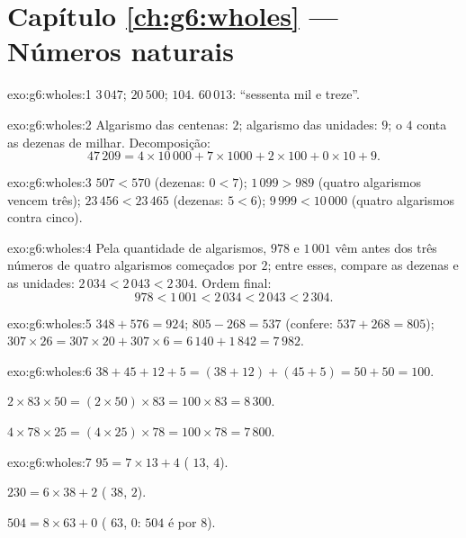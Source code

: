 \section*{Capítulo \ref{ch:g6:wholes} --- Números naturais}

\begin{solution}{exo:g6:wholes:1}
$3\,047$; \quad $20\,500$; \quad $104$. \quad
$60\,013$: ``sessenta mil e treze''.
\end{solution}

\begin{solution}{exo:g6:wholes:2}
Algarismo das centenas: $2$; algarismo das unidades: $9$; o $4$ conta as
dezenas de milhar. Decomposição:
\[
47\,209 = 4 \times 10\,000 + 7 \times 1000 + 2 \times 100 + 0 \times 10
+ 9 .
\]
\end{solution}

\begin{solution}{exo:g6:wholes:3}
$507 < 570$ (dezenas: $0 < 7$); \quad
$1\,099 > 989$ (quatro algarismos vencem três); \quad
$23\,456 < 23\,465$ (dezenas: $5 < 6$); \quad
$9\,999 < 10\,000$ (quatro algarismos contra cinco).
\end{solution}

\begin{solution}{exo:g6:wholes:4}
Pela quantidade de algarismos, $978$ e $1\,001$ vêm antes dos três
números de quatro algarismos começados por $2$; entre esses, compare as
dezenas e as unidades: $2\,034 < 2\,043 < 2\,304$. Ordem final:
\[
978 < 1\,001 < 2\,034 < 2\,043 < 2\,304 .
\]
\end{solution}

\begin{solution}{exo:g6:wholes:5}
$348 + 576 = 924$; \quad $805 - 268 = 537$ (confere:
$537 + 268 = 805$); \quad $307 \times 26 = 307 \times 20 + 307 \times 6
= 6\,140 + 1\,842 = 7\,982$.
\end{solution}

\begin{solution}{exo:g6:wholes:6}
$38 + 45 + 12 + 5 = (38 + 12) + (45 + 5) = 50 + 50 = 100$.

$2 \times 83 \times 50 = (2 \times 50) \times 83 = 100 \times 83 =
8\,300$.

$4 \times 78 \times 25 = (4 \times 25) \times 78 = 100 \times 78 =
7\,800$.
\end{solution}

\begin{solution}{exo:g6:wholes:7}
$95 = 7 \times 13 + 4$ ( $13$,  $4$).

$230 = 6 \times 38 + 2$ ( $38$,  $2$).

$504 = 8 \times 63 + 0$ ( $63$,  $0$: $504$ é 
por $8$).
\end{solution}

